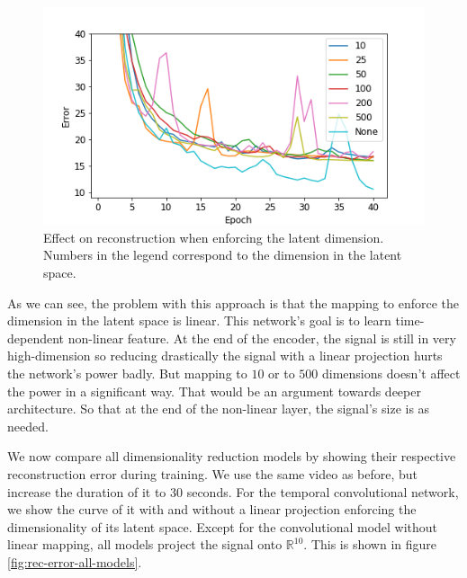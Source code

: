 \documentclass[twocolumn,10pt]{asme2ej}
\begin{document}
\begin{figure}[h]
    \centering
    \includegraphics[width=\columnwidth]{latent_dimension_comparison_tempconv.png}
    \caption{Effect on reconstruction when enforcing the latent dimension. Numbers in the legend correspond to the dimension in the latent space.}
    \label{fig:latent-dimension}
\end{figure}

As we can see, the problem with this approach is that the mapping to enforce the dimension in the latent space is linear. This network's goal is to learn time-dependent non-linear feature. At the end of the encoder, the signal is still in very high-dimension so reducing drastically the signal with a linear projection hurts the network's power badly. But mapping to $10$ or to $500$ dimensions doesn't affect the power in a significant way. That would be an argument towards deeper architecture. So that at the end of the non-linear layer, the signal's size is as needed.

We now compare all dimensionality reduction models by showing their respective reconstruction error during training. We use the same video as before, but increase the duration of it to $30$ seconds. For the temporal convolutional network, we show the curve of it with and without a linear projection enforcing the dimensionality of its latent space. Except for the convolutional model without linear mapping, all models project the signal onto $\mathbb{R}^{10}$. This is shown in figure \ref{fig:rec-error-all-models}.
\end{document}
